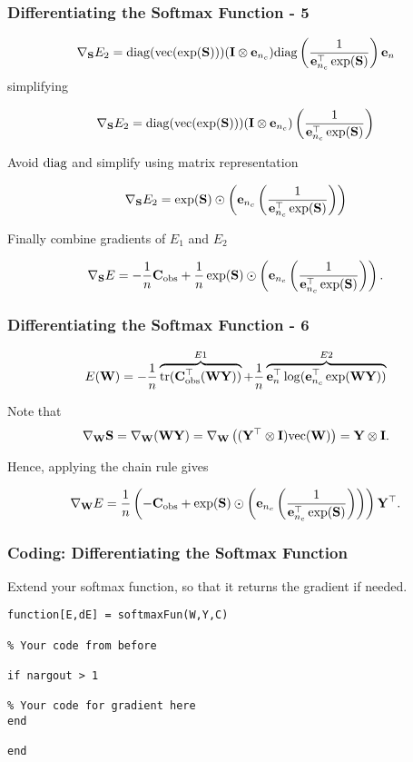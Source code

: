 \documentclass[12pt,fleqn,handout]{beamer}
\begin{document}
\begin{frame}[fragile]\frametitle{Differentiating the Softmax Function - 5}

 
 $$ \nabla_{{\bf S}}E_2 =     {\rm diag}( {\rm vec}(\exp({\bf S}))) ({\bf I} \otimes {\bf e}_{n_c})
  {\rm diag}
\left( {\frac {1}{{\bf e}_{n_c}^\top\exp({\bf S})}}\right) {\bf e}_n
     $$
\pause
simplifying

 $$ \nabla_{{\bf S}}E_2 =     {\rm diag}( {\rm vec}(\exp({\bf S}))) ({\bf I} \otimes {\bf e}_{n_c})
\left( {\frac {1}{{\bf e}_{n_c}^\top\exp({\bf S})}}\right)
     $$
 
\pause    
     Avoid ${\rm diag}$ and simplify using  matrix representation
     
 $$ \nabla_{{\bf S}}E_2 =     \exp({\bf S}) \odot 
\left( {\bf e}_{n_c} \left({\frac {1}{{\bf e}_{n_c}^\top \exp({\bf S})}}\right)\right) 
     $$
     
     \bigskip
     \pause
     Finally combine gradients of $E_1$ and $E_2$
     
$$     \nabla_{{\bf S}}E =  -\frac{1}{n}{\bf C}_{\rm obs} + \frac{1}{n}\exp({\bf S}) \odot 
\left( {\bf e}_{n_c} \left({\frac {1}{{\bf e}_{n_c}^\top \exp({\bf S})}}\right)\right) . $$
     
    

\end{frame}

\begin{frame}[fragile]\frametitle{Differentiating the Softmax Function - 6}

$$ E({\bf W}) = -\frac{1}{n}\overbrace{{\rm tr}({\bf C}_{\rm obs}^{\top} ({\bf W}{\bf Y}))}^{E1} + \frac{1}{n} \overbrace{{\bf e}_n^{\top}\log({\bf e}_{n_c}^\top \exp({\bf W}{\bf Y}))}^{E2}  $$

\bigskip
Note that
$$
	\nabla_{{\bf W}} {\bf S} = \nabla_{{\bf W}} ({\bf W} {\bf Y}) = \nabla_{{\bf W}} \left( ({\bf Y}^\top \otimes {\bf I}) {\rm vec}({\bf W}) \right) = {\bf Y} \otimes {\bf I}. 
$$


\bigskip

Hence, applying the chain rule gives
     
$$     \nabla_{{\bf W}}E = \frac{1}{n} \left( -{\bf C}_{\rm obs} + \exp({\bf S}) \odot 
\left( {\bf e}_{n_c} \left({\frac {1}{{\bf e}_{n_c}^\top \exp({\bf S})}}\right)\right) \right){\bf Y}^\top. $$
     

\end{frame}


\begin{frame}[fragile]\frametitle{Coding: Differentiating the Softmax Function}

Extend your softmax function, so that it returns the gradient if needed.

\begin{verbatim}
function[E,dE] = softmaxFun(W,Y,C)

% Your code from before

if nargout > 1

% Your code for gradient here
end

end
\end{verbatim}

\end{frame}
\end{document}
